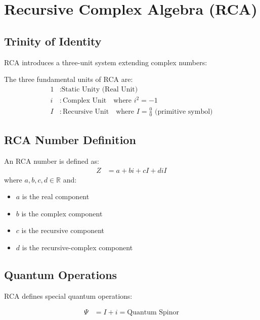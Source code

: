\documentclass[12pt,a4paper]{article}
\begin{document}
\section{Recursive Complex Algebra (RCA)}

\subsection{Trinity of Identity}

RCA introduces a three-unit system extending complex numbers:

\begin{definition}
The three fundamental units of RCA are:
\begin{align}
1 &: \text{Static Unity (Real Unit)} \\
i &: \text{Complex Unit} \quad \text{where } i^2 = -1 \\
I &: \text{Recursive Unit} \quad \text{where } I = \frac{0}{0} \text{ (primitive symbol)}
\end{align}
\end{definition}

\subsection{RCA Number Definition}

\begin{definition}
An RCA number is defined as:
\begin{align}
Z &= a + bi + cI + diI
\end{align}
where $a, b, c, d \in \mathbb{R}$ and:
\begin{itemize}
\item $a$ is the real component
\item $b$ is the complex component
\item $c$ is the recursive component
\item $d$ is the recursive-complex component
\end{itemize}
\end{definition}

\subsection{Quantum Operations}

RCA defines special quantum operations:

\begin{definition}
\begin{align}
\Psi &= I + i = \text{Quantum Spinor}
\end{align}
\end{definition}
\end{document}
